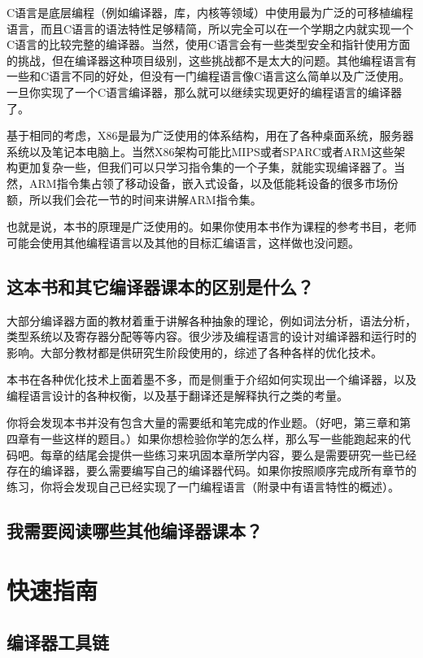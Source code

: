 \documentclass[cn,11pt,chinese]{elegantbook}
\begin{document}
C语言是底层编程（例如编译器，库，内核等领域）中使用最为广泛的可移植编程语言，而且C语言的语法特性足够精简，所以完全可以在一个学期之内就实现一个C语言的比较完整的编译器。当然，使用C语言会有一些类型安全和指针使用方面的挑战，但在编译器这种项目级别，这些挑战都不是太大的问题。其他编程语言有一些和C语言不同的好处，但没有一门编程语言像C语言这么简单以及广泛使用。一旦你实现了一个C语言编译器，那么就可以继续实现更好的编程语言的编译器了。

基于相同的考虑，X86是最为广泛使用的体系结构，用在了各种桌面系统，服务器系统以及笔记本电脑上。当然X86架构可能比MIPS或者SPARC或者ARM这些架构更加复杂一些，但我们可以只学习指令集的一个子集，就能实现编译器了。当然，ARM指令集占领了移动设备，嵌入式设备，以及低能耗设备的很多市场份额，所以我们会花一节的时间来讲解ARM指令集。

也就是说，本书的原理是广泛使用的。如果你使用本书作为课程的参考书目，老师可能会使用其他编程语言以及其他的目标汇编语言，这样做也没问题。

\section{这本书和其它编译器课本的区别是什么？}

大部分编译器方面的教材着重于讲解各种抽象的理论，例如词法分析，语法分析，类型系统以及寄存器分配等等内容。很少涉及编程语言的设计对编译器和运行时的影响。大部分教材都是供研究生阶段使用的，综述了各种各样的优化技术。

本书在各种优化技术上面着墨不多，而是侧重于介绍如何实现出一个编译器，以及编程语言设计的各种权衡，以及基于翻译还是解释执行之类的考量。

你将会发现本书并没有包含大量的需要纸和笔完成的作业题。（好吧，第三章和第四章有一些这样的题目。）如果你想检验你学的怎么样，那么写一些能跑起来的代码吧。每章的结尾会提供一些练习来巩固本章所学内容，要么是需要研究一些已经存在的编译器，要么需要编写自己的编译器代码。如果你按照顺序完成所有章节的练习，你将会发现自己已经实现了一门编程语言（附录中有语言特性的概述）。

\section{我需要阅读哪些其他编译器课本？}

\chapter{快速指南}

\section{编译器工具链}
\end{document}
